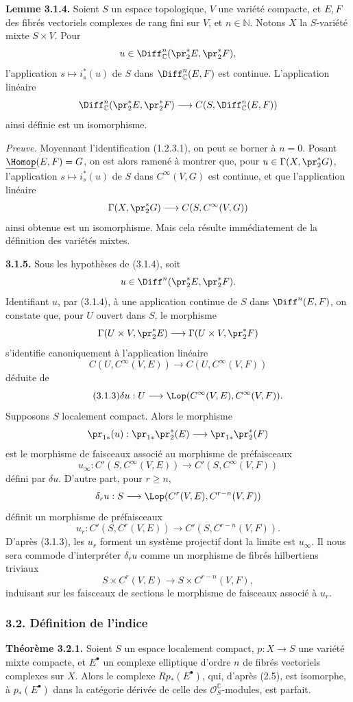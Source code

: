 \documentclass[11pt]{article}
\providecommand{\cO}{\mathcal O}
\providecommand{\N}{\mathbb N}
\begin{document}
\textbf{Lemme 3.1.4.} Soient $S$ un espace topologique, $V$ une variété compacte, et $E,F$ des fibrés vectoriels complexes de rang fini sur $V$, et $n\in\N$. Notons $X$ la $S$-variété mixte $S\times V$. Pour
\[
  u\in\Diff^n_\mathbb C(\pr_2^*E,\pr_2^*F),
\]
l'application $s\mapsto i_s^*(u)$ de $S$ dans $\Diff^n_\mathbb C(E,F)$ est continue. L'application linéaire
\[
  \Diff^n_\mathbb C(\pr_2^*E,\pr_2^*F)
  \longrightarrow C(S,\Diff^n_\mathbb C(E,F))
\]
ainsi définie est un isomorphisme.

\emph{Preuve.} Moyennant l'identification (1.2.3.1), on peut se borner à $n=0$. Posant $\underline{\Homop}(E,F)=G$, on est alors ramené à montrer que, pour $u\in\Gamma(X,\pr_2^*G)$, l'application $s\mapsto i_s^*(u)$ de $S$ dans $C^\infty(V,G)$ est continue, et que l'application linéaire
\[
  \Gamma(X,\pr_2^*G)\longrightarrow C(S,C^\infty(V,G))
\]
ainsi obtenue est un isomorphisme. Mais cela résulte immédiatement de la définition des variétés mixtes.

\textbf{3.1.5.} Sous les hypothèses de (3.1.4), soit
\[
  u\in\Diff^n(\pr_2^*E,\pr_2^*F).
\]
Identifiant $u$, par (3.1.4), à une application continue de $S$ dans $\Diff^n(E,F)$, on constate que, pour $U$ ouvert dans $S$, le morphisme
\[
  \Gamma(U\times V,\pr_2^*E)\longrightarrow \Gamma(U\times V,\pr_2^*F)
\]
s'identifie canoniquement à l'application linéaire
\[
  C(U,C^\infty(V,E))\longrightarrow C(U,C^\infty(V,F))
\]
déduite de
\begin{equation}\tag{3.1.3}
  \delta u:U\longrightarrow \Lop(C^\infty(V,E),C^\infty(V,F)).
\end{equation}
Supposons $S$ localement compact. Alors le morphisme
\[
  \pr_{1*}(u):\pr_{1*}\pr_2^*(E)
  \longrightarrow \pr_{1*}\pr_2^*(F)
\]
est le morphisme de faisceaux associé au morphisme de préfaisceaux
\[
  u_\infty:C'(S,C^\infty(V,E))
  \longrightarrow C'(S,C^\infty(V,F))
\]
défini par $\delta u$. D'autre part, pour $r\ge n$,
\[
  \delta_r u:S\longrightarrow \Lop(C^r(V,E),C^{r-n}(V,F))
\]
définit un morphisme de préfaisceaux
\[
  u_r:C'(S,C^r(V,E))
  \longrightarrow C'(S,C^{r-n}(V,F)).
\]
D'après (3.1.3), les $u_r$ forment un système projectif dont la limite est $u_\infty$. Il nous sera commode d'interpréter $\delta_r u$ comme un morphisme de fibrés hilbertiens triviaux
\[
  S\times C^r(V,E)\longrightarrow S\times C^{r-n}(V,F),
\]
induisant sur les faisceaux de sections le morphisme de faisceaux associé à $u_r$.

\subsubsection*{3.2. Définition de l'indice}
\textbf{Théorème 3.2.1.} Soient $S$ un espace localement compact, $p:X\to S$ une variété mixte compacte, et $E^\bullet$ un complexe elliptique d'ordre $n$ de fibrés vectoriels complexes sur $X$. Alors le complexe $Rp_*(E^\bullet)$, qui, d'après (2.5), est isomorphe, à $p_*(E^\bullet)$ dans la catégorie dérivée de celle des $\cO_S^\mathbb C$-modules, est parfait.
\end{document}
